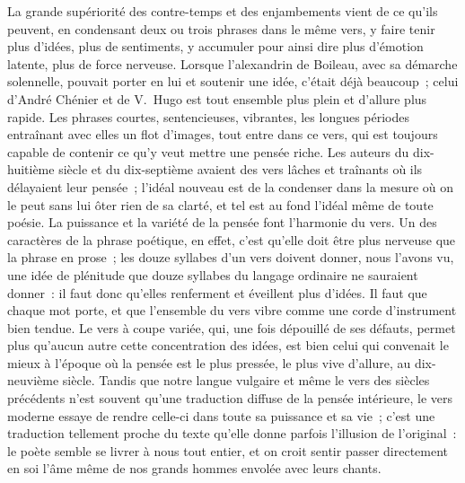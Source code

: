 \documentclass[french,twoside]{book} %
\begin{document}
La grande supériorité des contre-temps et des enjambements vient de ce qu’ils peuvent, en condensant deux ou trois phrases dans le même vers, y faire tenir plus d’idées, plus de sentiments, y accumuler pour ainsi dire plus d’émotion latente, plus de force nerveuse. Lorsque l’alexandrin de Boileau, avec sa démarche solennelle, pouvait porter en lui et soutenir une idée, c’était déjà beaucoup ; celui d’André Chénier et de V. Hugo est tout ensemble plus plein et d’allure plus rapide. Les phrases courtes, sentencieuses, vibrantes, les longues périodes entraînant avec elles un flot d’images, tout entre dans ce vers, qui est toujours capable de contenir ce qu’y veut mettre une pensée riche. Les auteurs du dix-huitième siècle et du dix-septième avaient des vers lâches et traînants où ils  délayaient leur pensée ; l’idéal nouveau est de la condenser dans la mesure où on le peut sans lui ôter rien de sa clarté, et tel est au fond l’idéal même de toute poésie. La puissance et la variété de la pensée font l’harmonie du vers. Un des caractères de la phrase poétique, en effet, c’est qu’elle doit être plus nerveuse que la phrase en prose ; les douze syllabes d’un vers doivent donner, nous l’avons vu, une idée de plénitude que douze syllabes du langage ordinaire ne sauraient donner : il faut donc qu’elles renferment et éveillent plus d’idées. Il faut que chaque mot porte, et que l’ensemble du vers vibre comme une corde d’instrument bien tendue. Le vers à coupe variée, qui, une fois dépouillé de ses défauts, permet plus qu’aucun autre cette concentration des idées, est bien celui qui convenait le mieux à l’époque où la pensée est le plus pressée, le plus vive d’allure, au dix-neuvième siècle. Tandis que notre langue vulgaire et même le vers des siècles précédents n’est souvent qu’une traduction diffuse de la pensée intérieure, le vers moderne essaye de rendre celle-ci dans toute sa puissance et sa vie ; c’est une traduction tellement proche du texte qu’elle donne parfois l’illusion de l’original : le poète semble se livrer à nous tout entier, et on croit sentir passer directement en soi l’âme même de nos grands hommes envolée avec leurs chants.\par
\end{document}
